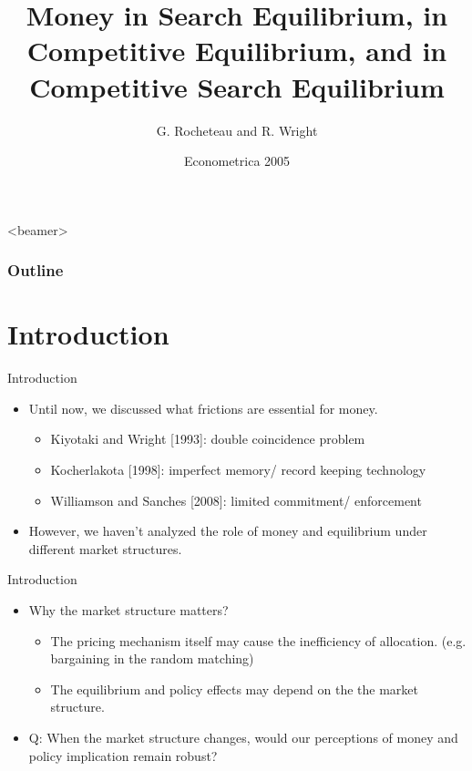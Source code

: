 \documentclass{beamer}
\title[Topics on Financial Markets]{Money in Search Equilibrium, in Competitive Equilibrium, and in Competitive Search Equilibrium}
\author{G. Rocheteau and R. Wright}
\date{Econometrica 2005}
\begin{document}
\begin{frame}
  \titlepage
\end{frame}

\begin{frame}<beamer>
\frametitle{Outline}
\tableofcontents
\end{frame}
  
\section{Introduction}

\begin{frame}{Introduction}
\begin{itemize}
    \item Until now, we discussed what frictions are essential for money.
    \begin{itemize}
        \item Kiyotaki and Wright [1993]: double coincidence problem
        \item Kocherlakota [1998]: imperfect memory/ record keeping technology
        \item Williamson and Sanches [2008]: limited commitment/ enforcement
    \end{itemize}
    \item However, we haven't analyzed the role of money and equilibrium under different market structures.
\end{itemize}
\end{frame}

\begin{frame}{Introduction}
\begin{itemize}
    \item Why the market structure matters?
    \begin{itemize}
        \item The pricing mechanism itself may cause the inefficiency of allocation. (e.g. bargaining in the random matching)
        \item The equilibrium and policy effects may depend on the the market structure.
    \end{itemize}
    \item Q: When the market structure changes, would our perceptions of money and policy implication remain robust?
\end{itemize}
\end{frame}
\end{document}
